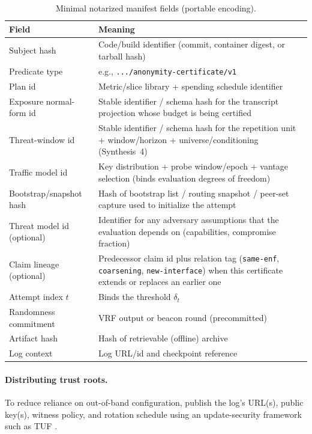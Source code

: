 \documentclass[11pt]{article}
\begin{document}


\begin{table}[t]
\centering
\begin{tabular}{@{}ll@{}}
\toprule
Field & Meaning \\
\midrule
Subject hash & Code/build identifier (commit, container digest, or tarball hash) \\
Predicate type & e.g., \texttt{.../anonymity-certificate/v1} \\
Plan id & Metric/slice library + spending schedule identifier \\
Exposure normal-form id & Stable identifier / schema hash for the transcript projection whose budget is being certified \\
Threat-window id & Stable identifier / schema hash for the repetition unit + window/horizon + universe/conditioning (Synthesis~4) \\
Traffic model id & Key distribution + probe window/epoch + vantage selection (binds evaluation degrees of freedom) \\
Bootstrap/snapshot hash & Hash of bootstrap list / routing snapshot / peer-set capture used to initialize the attempt \\
Threat model id (optional) & Identifier for any adversary assumptions that the evaluation depends on (capabilities, compromise fraction) \\
Claim lineage (optional) & Predecessor claim id plus relation tag (\texttt{same-enf}, \texttt{coarsening}, \texttt{new-interface}) when this certificate extends or replaces an earlier one \\
Attempt index $t$ & Binds the threshold $\delta_t$ \\
Randomness commitment & VRF output or beacon round (precommitted) \\
Artifact hash & Hash of retrievable (offline) archive \\
Log context & Log URL/id and checkpoint reference \\
\bottomrule
\end{tabular}
\caption{Minimal notarized manifest fields (portable encoding).}
\label{tab:manifest_fields}
\end{table}

\paragraph{Distributing trust roots.}
To reduce reliance on out-of-band configuration, publish the log's URL(s), public key(s), witness policy, and rotation schedule using an update-security framework such as TUF \cite{tuf_spec_latest}.
\end{document}
